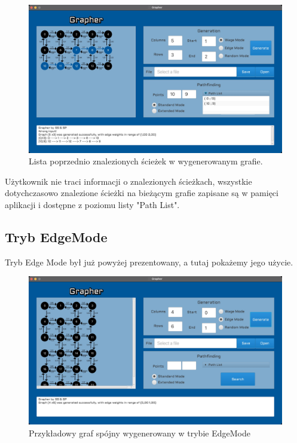 \documentclass[10pt, a4paper]{report}
\begin{document}
\begin{figure}[h]
  \begin{center}
    \includegraphics[scale=0.165]{grapherWageModePathList.jpg}
    \caption{Lista poprzednio znalezionych ścieżek w wygenerowanym grafie.}
  \end{center}
\end{figure}

Użytkownik nie traci informacji o znalezionych ścieżkach, wszystkie
dotychczasowo znalezione ścieżki na bieżącym grafie zapisane są w pamięci
aplikacji i dostępne z poziomu listy "Path List".
\newpage

\subsection{Tryb EdgeMode}\label{subsec:wywołania-edgemode}
Tryb Edge Mode był już powyżej prezentowany, a tutaj pokażemy jego użycie.

\begin{figure}[h]
  \begin{center}
    \includegraphics[scale=0.165]{grapherEdgeModeGeneration.jpg}
    \caption{Przykładowy graf spójny wygenerowany w trybie EdgeMode}
  \end{center}
\end{figure}
\end{document}
